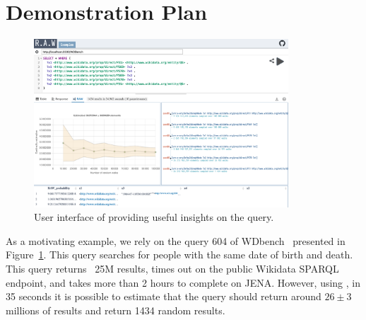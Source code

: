 




\section{Demonstration Plan}

 \begin{figure}
   \centering
   \includegraphics[width=0.85\textwidth]{figures/raw_screenshot.png}
   \caption{\label{fig:raw_screenshot}User interface of \NAME providing useful insights on the query.}
 \end{figure}


 As a motivating example, we rely on the query 604 of
 WDbench~\cite{angles2022wdbench} presented in
 Figure~\ref{fig:raw_screenshot}. This query searches for people
 with the same date of birth and death. This query returns ~25M results,
 times out on the public Wikidata SPARQL endpoint, and takes more than
 2 hours to complete on JENA. However, using \NAME, in 35 seconds it
 is possible to estimate that the query should return around $26 \pm 3$ 
 millions of results and return 1434 random results.

